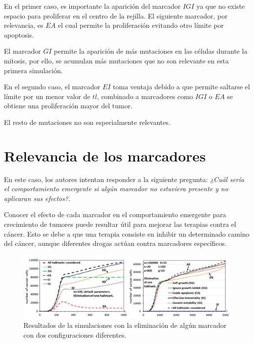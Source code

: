 En el primer caso, es importante la aparición del marcador $IGI$ ya que no existe espacio
para proliferar en el centro de la rejilla. El siguiente marcador, por relevancia, es $EA$
el cual permite la proliferación evitando otro límite por apoptosis.

El marcador $GI$ permite la aparición de más mutaciones en las células durante la mitosis, por ello,
se acumulan más mutaciones que no son relevante en esta primera simulación.

En el segundo caso, el marcador $EI$ toma ventaja debido a que permite saltarse el límite por un
menor valor de $tl$, combinado a marcadores como $IGI$ o $EA$ se obtiene una proliferación mayor del
tumor.

El resto de mutaciones no son especialmente relevantes.

\section{Relevancia de los marcadores}

En este caso, los autores intentan responder a la siguiente pregunta: \textit{¿Cuál sería
el comportamiento emergente si algún marcador no estuviera presente y no aplicaran
sus efectos?}.

Conocer el efecto de cada marcador en el comportamiento emergente para crecimiento de tumores
puede resultar útil para mejorar las terapias contra el cáncer. Esto se debe a que una terapia
consiste en inhibir un determinado camino del cáncer, aunque diferentes drogas actúan contra marcadores específicos.

\begin{figure}[h]
\centering
\includegraphics[scale=0.5]{figures/experiments/exp6}
\caption{Resultados de la simulaciones con la eliminación de algún marcador con dos configuraciones diferentes.}
\label{fig:exp6}
\end{figure}


